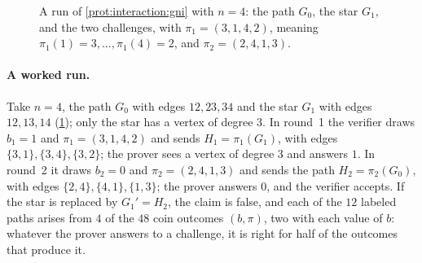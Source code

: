 \begin{refsection}
\begin{figure}[t]
\centering
{}
\caption{A run of \cref{prot:interaction:gni} with $n=4$: the path $G_0$, the star $G_1$, and the two challenges, with $\pi_1=(3,1,4,2)$, meaning $\pi_1(1)=3,\dots,\pi_1(4)=2$, and $\pi_2=(2,4,1,3)$.}\label{fig:interaction:worked}
\end{figure}

\paragraph{A worked run.} Take $n=4$, the path $G_0$ with edges $12,23,34$ and the star $G_1$ with edges $12,13,14$ (\cref{fig:interaction:worked}); only the star has a vertex of degree $3$. In round~1 the verifier draws $b_1=1$ and $\pi_1=(3,1,4,2)$ and sends $H_1=\pi_1(G_1)$, with edges $\{3,1\},\{3,4\},\{3,2\}$; the prover sees a vertex of degree $3$ and answers $1$. In round~2 it draws $b_2=0$ and $\pi_2=(2,4,1,3)$ and sends the path $H_2=\pi_2(G_0)$, with edges $\{2,4\},\{4,1\},\{1,3\}$; the prover answers $0$, and the verifier accepts. If the star is replaced by $G_1'=H_2$, the claim is false, and each of the $12$ labeled paths arises from $4$ of the $48$ coin outcomes $(b,\pi)$, two with each value of $b$: whatever the prover answers to a challenge, it is right for half of the outcomes that produce it.


\end{refsection}
